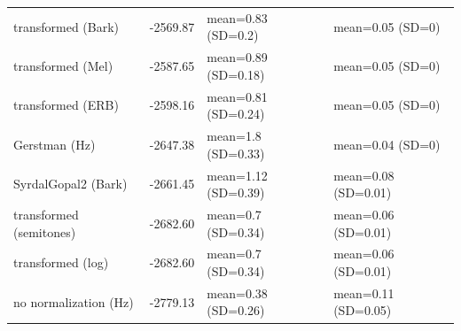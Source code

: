 \documentclass[preprint]{JASA}
\begin{document}
\begin{table}
\begin{tabular}{p{7cm}p{2cm}p{4cm}p{4cm}}
transformed (Bark) & -2569.87 & mean=0.83 (SD=0.2) & mean=0.05 (SD=0)\\
transformed (Mel) & -2587.65 & mean=0.89 (SD=0.18) & mean=0.05 (SD=0)\\
transformed (ERB) & -2598.16 & mean=0.81 (SD=0.24) & mean=0.05 (SD=0)\\
Gerstman (Hz) & -2647.38 & mean=1.8 (SD=0.33) & mean=0.04 (SD=0)\\
SyrdalGopal2 (Bark) & -2661.45 & mean=1.12 (SD=0.39) & mean=0.08 (SD=0.01)\\
transformed (semitones) & -2682.60 & mean=0.7 (SD=0.34) & mean=0.06 (SD=0.01)\\
transformed (log) & -2682.60 & mean=0.7 (SD=0.34) & mean=0.06 (SD=0.01)\\
no normalization (Hz) & -2779.13 & mean=0.38 (SD=0.26) & mean=0.11 (SD=0.05)\\
\bottomrule
\end{tabular}
\end{table}
\end{document}
